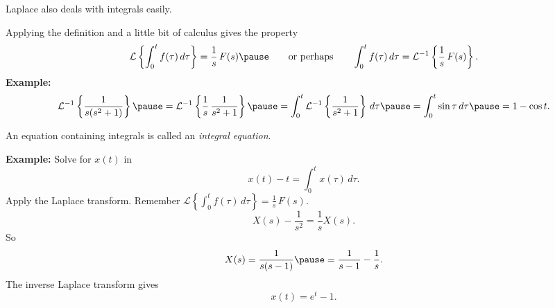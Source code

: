 \documentclass[10pt,aspectratio=169]{beamer}
\begin{document}
\begin{frame}
Laplace also deals with integrals easily.

\medskip
\pause

Applying the definition and a little bit of calculus gives
the property
\[
\mathcal{L} \left\{
\int_0^t f(\tau) \, d\tau
\right\} = \frac{1}{s} \, F(s)
\pause
\qquad
\text{or perhaps}
\qquad
\int_0^t f(\tau) \, d\tau
=
{\mathcal{L}}^{-1} \left\{
\frac{1}{s} \, F(s) \right\} .
\]
\pause
\textbf{Example:}
\[
{\mathcal{L}}^{-1} \left\{
\frac{1}{s(s^2+1)} \right\} 
\pause
=
{\mathcal{L}}^{-1} \left\{
\frac{1}{s} \, \frac{1}{s^2+1} \right\} 
\pause
=
\int_0^t 
{\mathcal{L}}^{-1} \left\{
\frac{1}{s^2+1} \right\} \, d\tau
\pause
=
\int_0^t 
\sin \tau \, d\tau
\pause
=
1 - \cos t .
\]
\end{frame}

\begin{frame}
An equation containing integrals is called an \emph{integral equation}.

\medskip
\pause

\textbf{Example:}
Solve for $x(t)$ in
\[
x(t) - t = \int_0^t x(\tau) \, d\tau .
\]
\pause
Apply the Laplace transform.  Remember
$\mathcal{L} \left\{
\int_0^t f(\tau) \, d\tau
\right\} = \frac{1}{s} \, F(s)$.
\[
X(s) - \frac{1}{s^2} = \frac{1}{s} X(s) .
\]
\pause
So
\[
X(s) = \frac{1}{s(s-1)} \pause = \frac{1}{s-1} - \frac{1}{s} .
\]
\pause
The inverse Laplace transform gives
\[
x(t) = e^t - 1 .
\]
\end{frame}
\end{document}
